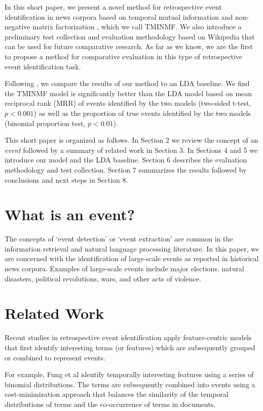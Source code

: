 \documentclass{sig-alternate}
\begin{document}
In this short paper, we present a novel method for retrospective event identification in news corpora based on temporal mutual information \cite{Teng2008} and non-negative matrix factorization \cite{Lee2001}, which we call TMINMF. We also introduce a preliminary test collection and evaluation methodology based on Wikipedia that can be used for future comparative research.  As far as we know, we are the first to propose a method for comparative evaluation in this type of retrospective event identification task.

Following \cite{Weng2011}, we compare the results of our method to an LDA baseline. We find the TMINMF model is significantly better than the LDA model based on mean reciprocal rank (MRR) of events identified by the two models (two-sided t-test, $p < 0.001$) as well as the proportion of true events identified by the two models (binomial proportion test, $p < 0.01$).

This short paper is organized as follows. In Section 2 we review the concept of an \emph{event} followed by a summary of related work in Section 3. In Sections 4 and 5 we introduce our model and the LDA baseline. Section 6 describes the evaluation methodology and test collection. Section 7 summarizes the results followed by conclusions and next steps in Section 8.

\section{What is an event?}

The concepts of `event detection' or `event extraction' are common in the information retrieval and natural language processing literature. In this paper, we are concerned with the identification of large-scale events as reported in historical news corpora.   Examples of large-scale events include major elections, natural disasters, political revolutions, wars, and other acts of violence.


\section{Related Work}

Recent studies in retrospective event identification apply feature-centric models \cite{Yi, Fung2005, Chen2009, Teng2008, Weng2011} that first identify interesting terms (or features) which are subsequently grouped or combined to represent events. 

For example, Fung et al \cite{Fung2005} identify temporally interesting features using a series of binomial distributions. The terms are subsequently combined  into events using a cost-minimization approach that balances the similarity of the temporal distributions of terms and the co-occurrence of terms in documents. 
\end{document}
